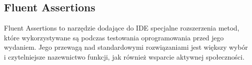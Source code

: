 \subsection{Fluent Assertions}
Fluent Assertions \cite{fluentassertions} to narzędzie dodające do IDE specjalne rozszerzenia
metod, które wykorzystywane są podczas testowania oprogramowania przed jego wydaniem.
Jego przewagą nad standardowymi rozwiązaniami jest większy wybór i czytelniejsze
nazewnictwo funkcji, jak również wsparcie aktywnej społeczności.